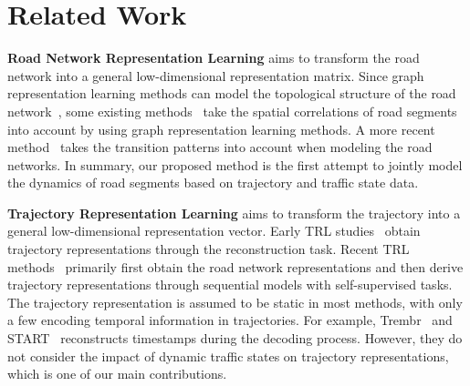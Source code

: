 \section{Related Work}
\textbf{Road Network Representation Learning} aims to transform the road network into a general low-dimensional representation matrix. Since graph representation learning methods can model the topological structure of the road network~\cite{DeepWalk,LINE,node2vec,GraphSAGE}, some existing methods~\cite{IRN2Vec,chen,SARN} take the spatial correlations of road segments into account by using graph representation learning methods. 
A more recent method~\cite{HRNR, yu2024bigcity} takes the transition patterns into account when modeling the road networks. In summary, our proposed method is the first attempt to jointly model the dynamics of road segments based on trajectory and traffic state data.


\textbf{Trajectory Representation Learning} aims to transform the trajectory into a general low-dimensional representation vector. Early TRL studies~\cite{trajectory2vec,t2vec} obtain trajectory representations through the reconstruction task. Recent TRL methods~\cite{TMRN,PIM,CSTRM,JCLRNT,WSCCL,Toast,MMTEC,START} primarily first obtain the road network representations and then derive trajectory representations through sequential models with self-supervised tasks. The trajectory representation is assumed to be static in most methods, with only a few encoding temporal information in trajectories. For example, Trembr~\cite{Trembr} and START~\cite{START} reconstructs timestamps during the decoding process. However, they do not consider the impact of dynamic traffic states on trajectory representations, which is one of our main contributions.
